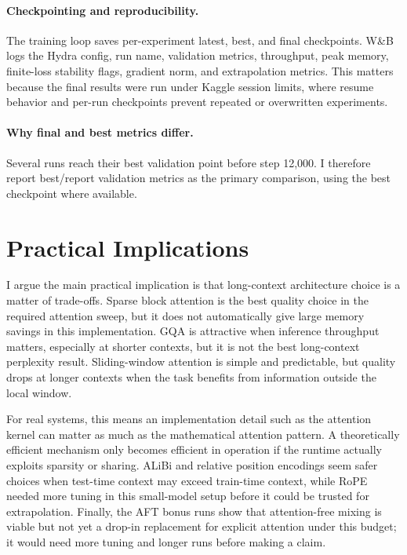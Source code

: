 \documentclass[11pt]{article}
\begin{document}
\paragraph{Checkpointing and reproducibility.}
The training loop saves per-experiment latest, best, and final checkpoints. W\&B logs the Hydra config, run name, validation metrics, throughput, peak memory, finite-loss stability flags, gradient norm, and extrapolation metrics. This matters because the final results were run under Kaggle session limits, where resume behavior and per-run checkpoints prevent repeated or overwritten experiments.

\paragraph{Why final and best metrics differ.}
Several runs reach their best validation point before step 12,000. I therefore report best/report validation metrics as the primary comparison, using the best checkpoint where available.

\section{Practical Implications}
I argue the main practical implication is that long-context architecture choice is a matter of trade-offs. Sparse block attention is the best quality choice in the required attention sweep, but it does not automatically give large memory savings in this implementation. GQA is attractive when inference throughput matters, especially at shorter contexts, but it is not the best long-context perplexity result. Sliding-window attention is simple and predictable, but quality drops at longer contexts when the task benefits from information outside the local window.

For real systems, this means an implementation detail such as the attention kernel can matter as much as the mathematical attention pattern. A theoretically efficient mechanism only becomes efficient in operation if the runtime actually exploits sparsity or sharing. ALiBi and relative position encodings seem safer choices when test-time context may exceed train-time context, while RoPE needed more tuning in this small-model setup before it could be trusted for extrapolation. Finally, the AFT bonus runs show that attention-free mixing is viable but not yet a drop-in replacement for explicit attention under this budget; it would need more tuning and longer runs before making a claim.
\end{document}
